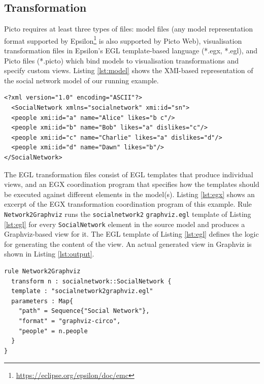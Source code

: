 \documentclass[sigconf,review]{acmart}
\begin{document}
\subsection{Transformation}
\label{sec:transformation}

Picto requires at least three types of files: model files (any model representation format supported by Epsilon\footnote{\url{https://eclipse.org/epsilon/doc/emc}} is also supported by Picto Web), visualisation transformation files in Epsilon's EGL template-based language (*.egx, *.egl), and Picto files (*.picto) which bind models to visualisation transformations and specify custom views. Listing \ref{lst:model} shows the XMI-based representation of the social network model of our running example. 

\begin{lstlisting}[firstnumber=1,style=model,caption={An a social network model as the input file for the lazy transformation. The format of the ids is simplified.},label=lst:model,float]
<?xml version="1.0" encoding="ASCII"?>
  <SocialNetwork xmlns="socialnetwork" xmi:id="sn">
  <people xmi:id="a" name="Alice" likes="b c"/>
  <people xmi:id="b" name="Bob" likes="a" dislikes="c"/>
  <people xmi:id="c" name="Charlie" likes="a" dislikes="d"/>
  <people xmi:id="d" name="Dawn" likes="b"/>
</SocialNetwork>
\end{lstlisting}

The EGL transformation files consist of EGL templates that produce individual views, and an EGX coordination program that specifies how the templates should be executed against different elements in the model(s). Listing \ref{lst:egx} shows an excerpt of the EGX transformation coordination program of this example. Rule \texttt{Network2Graphviz} runs the \texttt{socialnetwork2} \texttt{graphviz.egl} template of Listing \ref{lst:egl} for every \texttt{SocialNetwork} element in the source model and produces a Graphviz-based view for it. The EGL template of Listing \ref{lst:egl} defines the logic for generating the content of the view. An actual generated view in Graphviz is shown in Listing \ref{lst:output}. 

\begin{lstlisting}[firstnumber=1,style=egx,caption={The Network2Graphviz EGX rule},label=lst:egx,float]
rule Network2Graphviz 
  transform n : socialnetwork::SocialNetwork {
  template : "socialnetwork2graphviz.egl"
  parameters : Map{
    "path" = Sequence{"Social Network"},
    "format" = "graphviz-circo",
    "people" = n.people
  }
}
\end{lstlisting}
\end{document}
